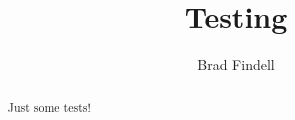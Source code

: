 \documentclass[handout,space,nooutcomes]{xourse}
\title{Testing}
\author{Brad Findell}
\begin{document}
\begin{abstract}
Just some tests!  
\end{abstract}
\maketitle

{}
\end{document}

